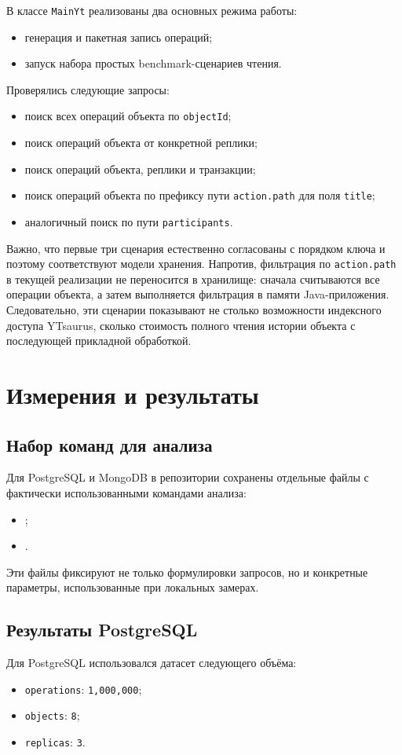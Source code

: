 \documentclass[a4paper,14pt]{extarticle}
\def\uppercase#1{#1}%
\def\makefirstuc#1{#1}%
\def\normalsize{}%
\newcommand{\withnumber}[1]{%
    \clearpage
    \section{\uppercase{#1}}
}
\newcommand{\mysubsection}[1]{%
    \subsection{\normalsize\makefirstuc{#1}}
}
\begin{document}
В классе \texttt{MainYt} реализованы два основных режима работы:
\begin{itemize}[leftmargin=1.25cm]
    \item генерация и пакетная запись операций;
    \item запуск набора простых benchmark-сценариев чтения.
\end{itemize}

Проверялись следующие запросы:
\begin{itemize}[leftmargin=1.25cm]
    \item поиск всех операций объекта по \texttt{objectId};
    \item поиск операций объекта от конкретной реплики;
    \item поиск операций объекта, реплики и транзакции;
    \item поиск операций объекта по префиксу пути \texttt{action.path} для поля \texttt{title};
    \item аналогичный поиск по пути \texttt{participants}.
\end{itemize}

Важно, что первые три сценария естественно согласованы с порядком ключа и
поэтому соответствуют модели хранения. Напротив, фильтрация по
\texttt{action.path} в текущей реализации не переносится в хранилище:
сначала считываются все операции объекта, а затем выполняется фильтрация в
памяти Java-приложения. Следовательно, эти сценарии показывают не столько
возможности индексного доступа YTsaurus, сколько стоимость полного чтения
истории объекта с последующей прикладной обработкой.

\withnumber{Измерения и результаты}

\mysubsection{Набор команд для анализа}

Для PostgreSQL и MongoDB в репозитории сохранены отдельные файлы с фактически использованными
командами анализа:
\begin{itemize}[leftmargin=1.25cm]
    \item {};
    \item {}.
\end{itemize}

Эти файлы фиксируют не только формулировки запросов, но и конкретные параметры,
использованные при локальных замерах.

\mysubsection{Результаты PostgreSQL}

Для PostgreSQL использовался датасет следующего объёма:
\begin{itemize}[leftmargin=1.25cm]
    \item \texttt{operations}: \texttt{1,000,000};
    \item \texttt{objects}: \texttt{8};
    \item \texttt{replicas}: \texttt{3}.
\end{itemize}
\end{document}
